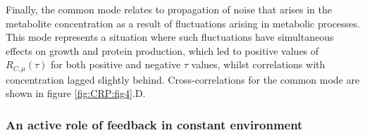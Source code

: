 %
Finally, the common mode relates to propagation of noise that arises in the metabolite concentration as a result of fluctuations arising in metabolic processes.
This mode represents a situation where such fluctuations have simultaneous effects on growth and protein production, which led to positive values of $R_{C,\mu}(\tau)$ for both 
positive and negative $\tau$ values, whilst correlations with concentration lagged slightly behind.
Cross-correlations for the common mode are shown in figure \ref{fig:CRP:fig4}.D.
%




\subsubsection{An active role of feedback in constant environment}

